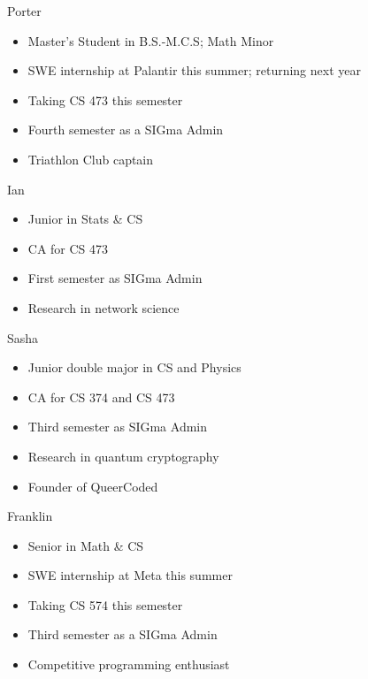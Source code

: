 \documentclass[aspectratio=169]{beamer}
\begin{document}


\begin{frame}{Porter}
    \begin{itemize}
        \item Master's Student in B.S.-M.C.S; Math Minor
        \item SWE internship at Palantir this summer; returning next year
        \item Taking CS 473 this semester
        \item Fourth semester as a SIGma Admin
        \item Triathlon Club captain
    \end{itemize}
\end{frame}


\begin{frame}{Ian}
    \begin{itemize}
        \item Junior in Stats \& CS
        \item CA for CS 473 
        \item First semester as SIGma Admin
        \item Research in network science
    \end{itemize}
\end{frame}


\begin{frame}{Sasha}
    \begin{itemize}
        \item Junior double major in CS and Physics
        \item CA for CS 374 and CS 473 
        \item Third semester as SIGma Admin
        \item Research in quantum cryptography
        \item Founder of QueerCoded
    \end{itemize}
\end{frame}

\begin{frame}{Franklin}
    \begin{itemize}
        \item Senior in Math \& CS
        \item SWE internship at Meta this summer
        \item Taking CS 574 this semester
        \item Third semester as a SIGma Admin
        \item Competitive programming enthusiast
    \end{itemize}
\end{frame}
\end{document}
